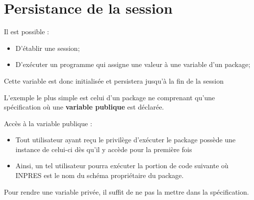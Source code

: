 \documentclass[10pt]{beamer}
\begin{document}
\begin{frame}{\secname}
    
\end{frame}

\section{Persistance de la session}
\begin{frame}{\secname}
    Il est possible :
    \begin{itemize}
        \item D'établir une session;
        \item D'exécuter un programme qui assigne une valeur à une variable d'un package;
    \end{itemize}
    Cette variable est donc initialisée et persistera jusqu'à la fin de la session
\end{frame}

\begin{frame}{\secname}
    L'exemple le plus simple est celui d'un package ne comprenant qu'une spécification où une \textbf{variable publique} est déclarée.
    
\end{frame}

\begin{frame}{\secname}
    Accès à la variable publique :
    \begin{itemize}
        \item Tout utilisateur ayant reçu le privilège d'exécuter le package possède une instance de celui-ci dès qu'il y accède pour la première fois
        \item Ainsi, un tel utilisateur pourra exécuter la portion de code suivante où INPRES est le nom du schéma propriétaire du package.
    \end{itemize}
    
\end{frame}

\begin{frame}{\secname}
    Pour rendre une variable privée, il suffit de ne pas la mettre dans la spécification.
    
\end{frame}
\end{document}
